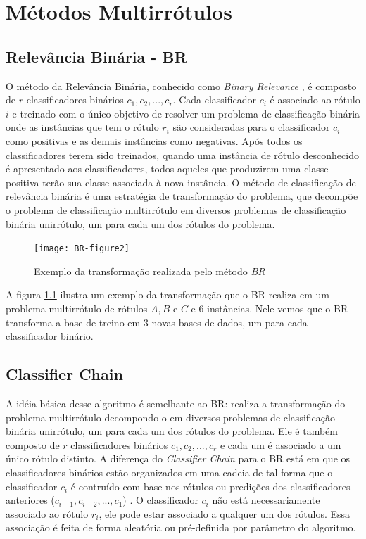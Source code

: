 \chapter{Métodos Multirrótulos}
\section{Relevância Binária - BR}
\label{sec:br}


O método da Relevância Binária, conhecido como \textit{Binary Relevance} \cite{br2010}, 
é composto de $r$ classificadores binários $c_1,c_2,...,c_r$. Cada classificador $c_i$ 
é associado ao rótulo $i$ e treinado com o único objetivo de resolver
um problema de classificação binária onde as instâncias que
tem o rótulo $r_i$ são consideradas para o classificador $c_i$ como positivas
e as demais instâncias como
negativas. 
Após todos os classificadores terem sido treinados, quando uma instância
de rótulo desconhecido 
é apresentado aos classificadores, todos aqueles que produzirem uma classe positiva
terão sua classe associada à nova instância.
O método de classificação de relevância binária é uma estratégia de transformação do
problema, que decompõe o problema de classificação multirrótulo em diversos problemas
de classificação binária unirrótulo, um para cada um dos rótulos do problema.

\begin{figure}
 \texttt{[image: BR-figure2]}
 
 \caption{Exemplo da transformação realizada pelo método \textit{BR}}
\label{fig:br}

\end{figure}

A figura \ref{fig:br} ilustra um exemplo da transformação que o BR realiza em um problema multirrótulo
de rótulos $A,B$ e $C$ e 6 instâncias. Nele vemos que o BR transforma a base de treino em 3 novas bases
de dados, um para cada classificador binário.





\section{Classifier Chain}


A idéia básica desse algoritmo é semelhante ao BR: realiza a transformação do
problema multirrótulo decompondo-o em diversos problemas
de classificação binária unirrótulo, um para cada um dos rótulos do problema.
Ele é também composto de $r$ classificadores binários $c_1,c_2,...,c_r$ e cada um
é associado a um único rótulo distinto. A diferença do \textit{Classifier Chain} para o BR está
em que os classificadores binários estão organizados em uma cadeia de tal forma que
o classificador $c_i$ é contruído com base nos rótulos ou predições dos classificadores anteriores
($c_{i-1},c_{i-2},...,c_{1}$) \cite{cc2009}. O classificador $c_i$ não está necessariamente associado ao rótulo $r_i$,
ele pode estar associado a qualquer um dos rótulos.
Essa associação é feita de forma aleatória ou pré-definida por parâmetro do algoritmo.

